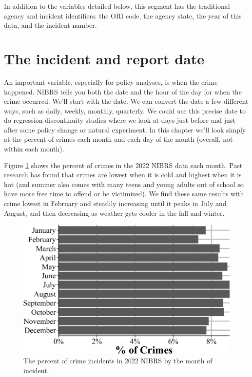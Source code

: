 \documentclass[
  12pt,
  openany]{book}
\begin{document}
In addition to the variables detailed below, this segment has the traditional agency and incident identifiers: the ORI code, the agency state, the year of this data, and the incident number.

\section{The incident and report date}\label{the-incident-and-report-date}

An important variable, especially for policy analyses, is when the crime happened. NIBRS tells you both the date and the hour of the day for when the crime occurred. We'll start with the date. We can convert the date a few different ways, such as daily, weekly, monthly, quarterly. We could use this precise date to do regression discontinuity studies where we look at days just before and just after some policy change or natural experiment. In this chapter we'll look simply at the percent of crimes each month and each day of the month (overall, not within each month).

Figure \ref{fig:administrativeIncidentMonth} shows the percent of crimes in the 2022 NIBRS data each month. Past research has found that crimes are lowest when it is cold and highest when it is hot (and summer also comes with many teens and young adults out of school so have more free time to offend or be victimized). We find these same results with crime lowest in February and steadily increasing until it peaks in July and August, and then decreasing as weather gets cooler in the fall and winter.

\begin{figure}

{\centering \includegraphics[width=0.9\linewidth]{12_nibrs_administrative_files/figure-latex/administrativeIncidentMonth-1} 

}

\caption{The percent of crime incidents in 2022 NIBRS by the month of incident.}\label{fig:administrativeIncidentMonth}
\end{figure}
\end{document}
